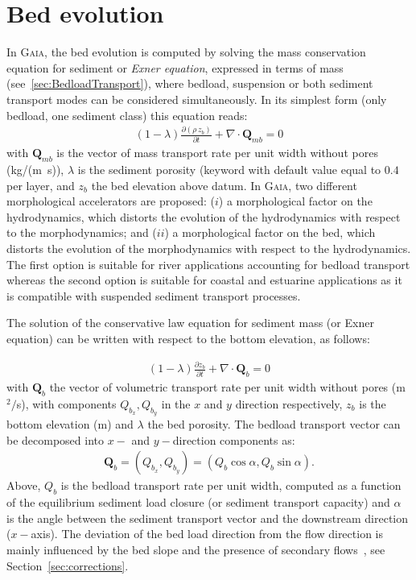 \pagebreak
\section{Bed evolution}\label{sec:bedevol}

In \textsc{Gaia}, the bed evolution is computed by solving the mass conservation equation for sediment or \textit{Exner equation}, expressed in terms of mass (see~\ref{sec:BedloadTransport}), where bedload, suspension or both sediment transport modes can be considered simultaneously. In its simplest form (only bedload, one sediment class) this equation reads:
\begin{align}
  (1-\lambda)\frac{\partial (\rho\,z_b)}{\partial t} + \nabla\cdot\mathbf{Q}_{mb}=0
\end{align}
with $\mathbf Q_{mb}$ is the vector of mass transport rate per unit width without pores (kg/(m~s)), $\lambda$ is the sediment porosity (keyword  with default value equal to $0.4$ per layer, and $z_b$ the bed elevation above datum.
In \textsc{Gaia}, two different morphological accelerators are proposed: ($i$) a morphological factor on the hydrodynamics, which distorts the evolution of the hydrodynamics with respect to the morphodynamics; and ($ii$) a morphological factor on the bed, which distorts the evolution of the morphodynamics with respect to the hydrodynamics. The first option is suitable for river applications accounting for bedload transport whereas the second option is suitable for coastal and estuarine applications as it is compatible with suspended sediment transport processes.

The solution of the conservative law equation for sediment mass (or Exner equation) can be written with respect to the bottom elevation, as follows:

\begin{align}
(1-\lambda)\frac{\partial z_b}{\partial t} + \nabla\cdot \mathbf Q_b = 0
\label{eq:Exner}
\end{align}
with $\mathbf Q_b$ the vector of volumetric transport rate per unit width without pores (m$^2/$s), with components $Q_{b_x}, Q_{b_y}$ in the $x$ and $y$ direction respectively, $z_b$ is the bottom elevation (m) and $\lambda$ the bed porosity. The bedload transport vector can be decomposed into $x-$ and $y-$direction components as:
\begin{align}
\mathbf Q_b = (Q_{b_x}, Q_{b_y}) = (Q_b \cos\alpha, Q_b \sin\alpha).
\label{eq:bedloadtransportvector}
\end{align}
Above, $Q_b$ is the bedload transport rate per unit width, computed as a function of the equilibrium sediment load closure (or sediment transport capacity) and $\alpha$ is the angle between the sediment transport vector and the downstream direction ($x-$axis).
The deviation of the bed load direction from the flow direction is mainly influenced by the bed slope and the presence of secondary flows~\cite{Talmon95}, see Section~\ref{sec:corrections}.

